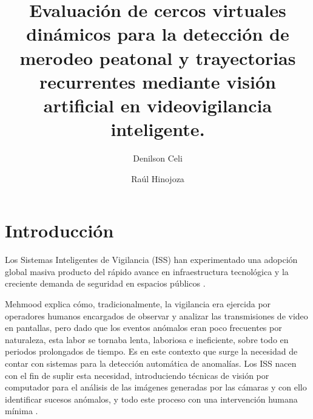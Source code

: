 \documentclass[runningheads]{llncs}
\begin{document}
\renewcommand{\tablename}{Tabla}
%
\title{Evaluación de cercos virtuales dinámicos para la detección de merodeo peatonal y trayectorias recurrentes mediante visión artificial en videovigilancia inteligente.}
%
%
\author{Denilson Celi \and
Raúl Hinojoza}
%
%
%
\maketitle              %
%
 
 
%
%
%
\section{Introducción}

Los Sistemas Inteligentes de Vigilancia (ISS) han experimentado una adopción global masiva producto del rápido avance en infraestructura tecnológica y la creciente demanda de seguridad en espacios públicos \cite{choudhry2023,wahyono2023}.


Mehmood \cite{mehmood2021} explica cómo, tradicionalmente, la vigilancia era ejercida por operadores humanos encargados de observar y analizar las transmisiones de video en pantallas, pero dado que los eventos anómalos eran poco frecuentes por naturaleza, esta labor se tornaba lenta, laboriosa e ineficiente, sobre todo en periodos prolongados de tiempo. Es en este contexto que surge la necesidad de contar con sistemas para la detección automática de anomalías. Los ISS nacen con el fin de suplir esta necesidad, introduciendo técnicas de visión por computador para el análisis de las imágenes generadas por las cámaras y con ello identificar sucesos anómalos, y todo este proceso con una intervención humana mínima \cite{wahyono2023}.
\end{document}
